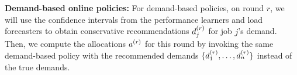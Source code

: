 % 

\insertFigDemRecIllus

\textbf{Demand-based online policies:}
For demand-based policies, 
on round $r$, we will use the confidence intervals from the performance learners and load
forecasters to obtain conservative recommendations
$d_{j}^{(r)}$ for job $j$'s demand.
Then, we compute the allocations $a^{(r)}$ for this round by invoking the same demand-based
policy with the recommended demands $\{d_{1}^{(r)},\dots, d_{n}^{(r)}\}$ instead of the true
demands.

